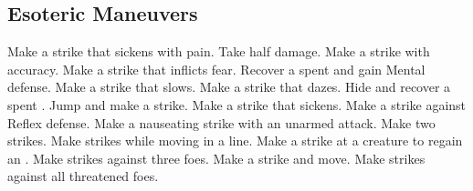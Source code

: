 
\small
\subsection{Esoteric Maneuvers}\label{Esoteric Maneuvers}
\begin{spelllist}
 Make a strike that sickens with pain.
 Take half damage.
 Make a strike with  accuracy.
 Make a strike that inflicts fear.
 Recover a spent  and gain  Mental defense.
 Make a strike that slows.
 Make a strike that dazes.
 Hide and recover a spent .
 Jump and make a strike.
 Make a strike that sickens.
 Make a strike against Reflex defense.
 Make a nauseating strike with an unarmed attack.
 Make two strikes.
 Make strikes while moving in a line.
 Make a strike at a creature to regain an .
 Make strikes against three foes.
 Make a strike and move.
 Make strikes against all threatened foes.
\end{spelllist}



\small
